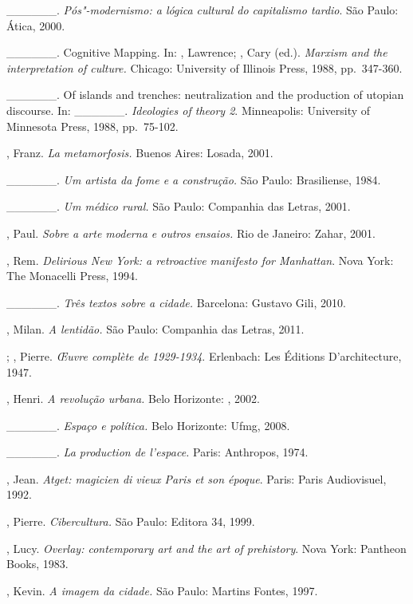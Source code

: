 \begin{Parskip}
\_\_\_\_\_\_. \emph{Pós"-modernismo: a lógica cultural do
capitalismo tardio}. São Paulo: Ática, 2000.

\_\_\_\_\_\_. Cognitive Mapping. In: , Lawrence; ,
Cary (ed.). \emph{Marxism and the interpretation of culture.} Chicago:
University of Illinois Press, 1988, pp.~347-360.

\_\_\_\_\_\_. Of islands and trenches: neutralization and the
production of utopian discourse. In: \_\_\_\_\_\_.
\emph{Ideologies of theory 2}. Minneapolis: University of Minnesota
Press, 1988, pp.~75-102.

, Franz. \emph{La metamorfosis.} Buenos Aires: Losada, 2001.

\_\_\_\_\_\_. \emph{Um artista da fome e a construção.} São Paulo:
Brasiliense, 1984.

\_\_\_\_\_\_. \emph{Um médico rural.} São Paulo: Companhia das
Letras, 2001.

, Paul. \emph{Sobre a arte moderna e outros ensaios.} Rio de
Janeiro: Zahar, 2001.

, Rem. \emph{Delirious New York: a retroactive manifesto for
Manhattan}. Nova York: The Monacelli Press, 1994.

\_\_\_\_\_\_. \emph{Três textos sobre a cidade.} Barcelona: %
Gustavo Gili, 2010.

, Milan. \emph{A lentidão.} São Paulo: Companhia das Letras,
2011.

; , Pierre. \emph{\OE uvre complète de 1929-1934}.
Erlenbach: Les Éditions D'architecture, 1947.

, Henri. \emph{A revolução urbana.} Belo Horizonte: ,
2002.

\_\_\_\_\_\_. \emph{Espaço e política.} Belo Horizonte: Ufmg, 2008.

\_\_\_\_\_\_. \emph{La production de l'espace.} Paris: Anthropos, 1974.

, Jean. \emph{Atget: magicien di vieux Paris et son époque}.
Paris: Paris Audiovisuel, 1992.

, Pierre. \emph{Cibercultura.} São Paulo: Editora 34, 1999.

, Lucy. \emph{Overlay: contemporary art and the art of
prehistory}. Nova York: Pantheon Books, 1983.

, Kevin. \emph{A imagem da cidade.} São Paulo: Martins Fontes,
1997.


\end{Parskip}
